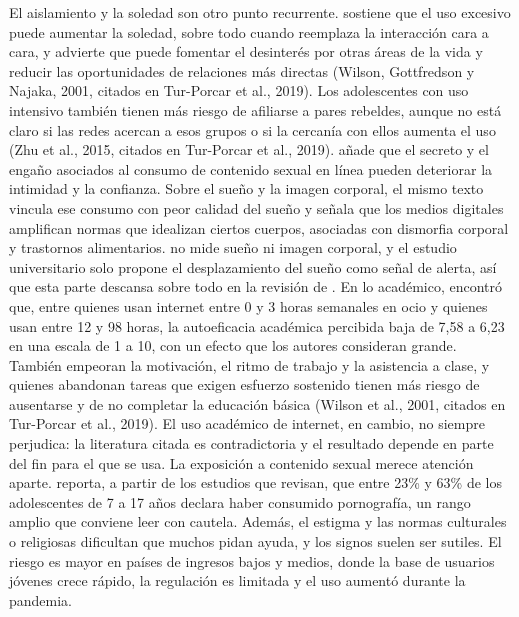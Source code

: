 \documentclass[10pt,letterpaper]{article}
\begin{document}
El aislamiento y la soledad son otro punto recurrente. \citep{dadi2024adolescents} sostiene que el uso excesivo puede aumentar la soledad, sobre todo cuando reemplaza la interacción cara a cara, y \citep{eficacia_academica} advierte que puede fomentar el desinterés por otras áreas de la vida y reducir las oportunidades de relaciones más directas (Wilson, Gottfredson y Najaka, 2001, citados en Tur-Porcar et al., 2019). Los adolescentes con uso intensivo también tienen más riesgo de afiliarse a pares rebeldes, aunque no está claro si las redes acercan a esos grupos o si la cercanía con ellos aumenta el uso (Zhu et al., 2015, citados en Tur-Porcar et al., 2019). \citep{dadi2024adolescents} añade que el secreto y el engaño asociados al consumo de contenido sexual en línea pueden deteriorar la intimidad y la confianza. Sobre el sueño y la imagen corporal, el mismo texto vincula ese consumo con peor calidad del sueño y señala que los medios digitales amplifican normas que idealizan ciertos cuerpos, asociadas con dismorfia corporal y trastornos alimentarios. \citep{eficacia_academica} no mide sueño ni imagen corporal, y el estudio universitario solo propone el desplazamiento del sueño como señal de alerta, así que esta parte descansa sobre todo en la revisión de \citep{dadi2024adolescents}.
En lo académico, \citep{eficacia_academica} encontró que, entre quienes usan internet entre 0 y 3 horas semanales en ocio y quienes usan entre 12 y 98 horas, la autoeficacia académica percibida baja de 7,58 a 6,23 en una escala de 1 a 10, con un efecto que los autores consideran grande. También empeoran la motivación, el ritmo de trabajo y la asistencia a clase, y quienes abandonan tareas que exigen esfuerzo sostenido tienen más riesgo de ausentarse y de no completar la educación básica (Wilson et al., 2001, citados en Tur-Porcar et al., 2019). El uso académico de internet, en cambio, no siempre perjudica: la literatura citada es contradictoria y el resultado depende en parte del fin para el que se usa.
La exposición a contenido sexual merece atención aparte. \citep{dadi2024adolescents} reporta, a partir de los estudios que revisan, que entre 23\% y 63\% de los adolescentes de 7 a 17 años declara haber consumido pornografía, un rango amplio que conviene leer con cautela. Además, el estigma y las normas culturales o religiosas dificultan que muchos pidan ayuda, y los signos suelen ser sutiles. El riesgo es mayor en países de ingresos bajos y medios, donde la base de usuarios jóvenes crece rápido, la regulación es limitada y el uso aumentó durante la pandemia.
\end{document}
